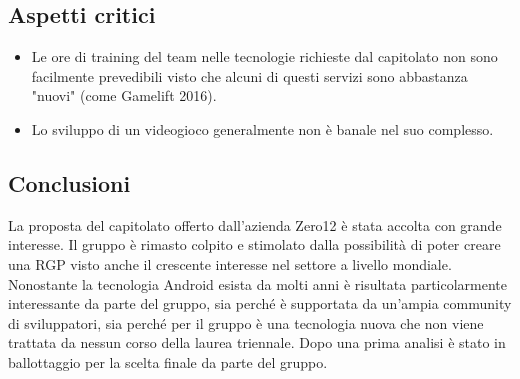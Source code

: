 \subsection{Aspetti critici}
\begin{itemize}
\item Le ore di training del team nelle tecnologie richieste dal capitolato non sono facilmente prevedibili visto che alcuni di questi servizi sono abbastanza "nuovi" (come Gamelift 2016).
\item Lo sviluppo di un videogioco generalmente non è banale nel suo complesso.
\end{itemize}
\subsection{Conclusioni}
La proposta del capitolato offerto dall'azienda Zero12 è stata accolta con grande interesse. Il gruppo è rimasto colpito e stimolato dalla possibilità 
di poter creare una RGP visto anche il crescente interesse nel settore a livello mondiale. Nonostante la tecnologia Android esista da molti anni è risultata particolarmente 
interessante da parte del gruppo, sia perché è supportata da un'ampia community di sviluppatori, sia perché per il gruppo è una tecnologia nuova che non viene 
trattata da nessun corso della laurea triennale. Dopo una prima analisi è stato in ballottaggio per la scelta finale da parte del gruppo.
